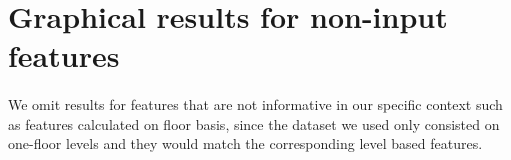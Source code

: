 \section{Graphical results for non-input features}
\paragraph{} We omit results for features that are not informative in our specific context such as features calculated on floor basis, since the dataset we used only consisted on one-floor levels and they would match the corresponding level based features.


